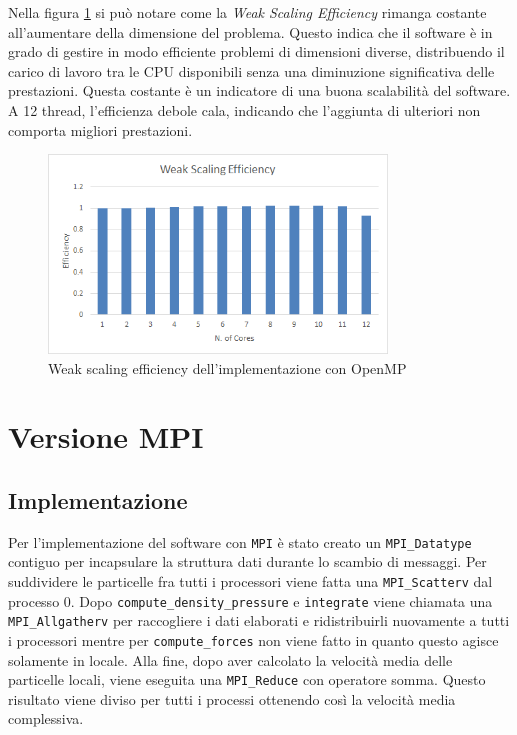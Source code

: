 \documentclass[a4paper, 12pt]{report}
\begin{document}
\begin{sloppypar}
  \newpage
  \noindent
  Nella figura \ref{fig:omp_wse} si può notare come la \textit{Weak Scaling Efficiency} rimanga costante 
  all'aumentare della dimensione del problema. Questo indica che il software è in grado di gestire in 
  modo efficiente problemi di dimensioni diverse, distribuendo il carico di lavoro tra le CPU disponibili 
  senza una diminuzione significativa delle prestazioni. Questa costante è un indicatore
  di una buona scalabilità del software. A 12 thread, l'efficienza debole cala, indicando che l'aggiunta di ulteriori
  non comporta migliori prestazioni.


  \begin{figure}[ht]
    \centering
    \includegraphics[width=9cm]{img/omp-wse.png}
    \caption{Weak scaling efficiency dell'implementazione con OpenMP}
    \label{fig:omp_wse}
  \end{figure}
\end{sloppypar}

{\let\clearpage\relax\chapter*{Versione MPI}}
\section*{Implementazione}
Per l'implementazione del software con \texttt{MPI} è stato creato un \texttt{MPI\_Datatype} contiguo per incapsulare la struttura
dati durante lo scambio di messaggi. Per suddividere le particelle fra tutti i processori viene fatta una \texttt{MPI\_Scatterv} dal processo 0.
Dopo \texttt{compute\_density\_pressure} e \texttt{integrate} viene chiamata una \texttt{MPI\_Allgatherv} per raccogliere i dati elaborati
e ridistribuirli nuovamente a tutti i processori mentre per \texttt{compute\_forces} non viene fatto in quanto questo agisce solamente in locale.
Alla fine, dopo aver calcolato la velocità media delle particelle locali, viene eseguita una \texttt{MPI\_Reduce} con operatore somma.
Questo risultato viene diviso per tutti i processi ottenendo così la velocità media complessiva.
\end{document}
